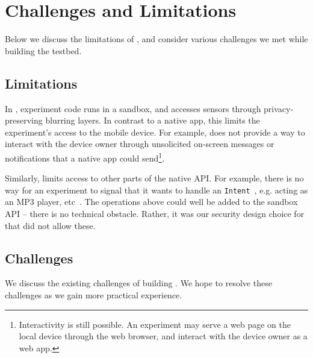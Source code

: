 \section{Challenges and Limitations}\label{sec-limitation}

Below we discuss the limitations of \sysname, 
and consider various challenges we met while building the testbed.

\subsection{Limitations}\label{subsec-limitations}
In \sysname, experiment code runs in a sandbox, and 
accesses sensors through privacy-preserving blurring layers. 
In contrast to a native app, this limits
the experiment's access to the mobile device. For example, \sysname 
does not provide a way to interact with the device owner 
through unsolicited on-screen messages or notifications that a native 
app could send\footnote{\scriptsize Interactivity is still possible. 
An experiment may serve a web 
page on the local device through the web browser, and interact with 
the device owner as a web app.}. 

Similarly, \sysname limits access to other parts 
of the native API. For example, there is no way for an experiment to 
signal that it wants to handle an \texttt{Intent}~\cite{intent}, e.g. 
acting as an MP3 player, etc~\cite{intent-dev}.
The operations above 
could well be added to the sandbox API -- there is no technical 
obstacle. Rather, it was our security design 
choice for \sysname that did not allow these.


\subsection{Challenges}\label{subsec-challenges}

We discuss the existing challenges of building \sysname. We hope to 
resolve these challenges as we gain more practical experience. 


